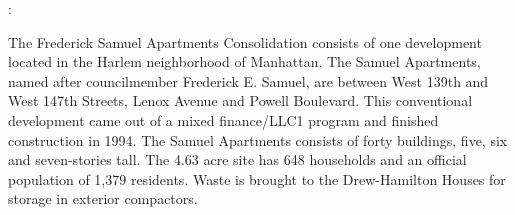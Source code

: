 :

The Frederick Samuel Apartments Consolidation consists of one development located in the Harlem neighborhood of Manhattan. The Samuel Apartments, named after councilmember Frederick E. Samuel,  are between West 139th and West 147th Streets, Lenox Avenue and Powell Boulevard. This conventional development came out of a mixed finance/LLC1 program and finished construction in 1994. The Samuel Apartments consists of forty buildings, five, six and seven-stories tall. The 4.63 acre site has 648 households and an official population of 1,379 residents. Waste is brought to the Drew-Hamilton Houses for storage in exterior compactors.